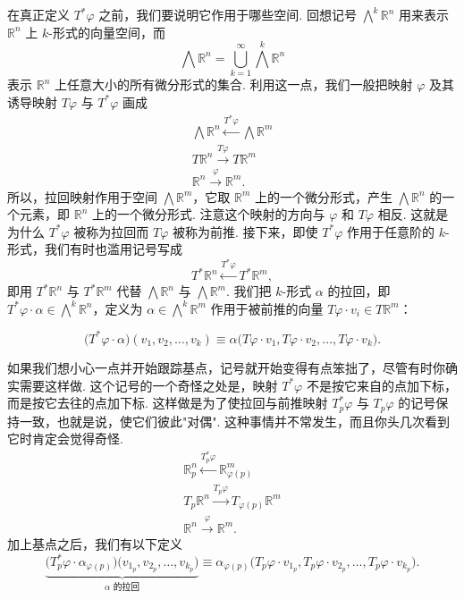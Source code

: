 在真正定义 $T^*\varphi$ 之前，我们要说明它作用于哪些空间. 回想记号 $\bigwedge^k\mathbb{R}^n$ 用来表示 $\mathbb{R}^n$ 上 $k$-形式的向量空间，而
\[
\bigwedge\mathbb{R}^n=\bigcup_{k=1}^{\infty}\bigwedge^k\mathbb{R}^n
\]
表示 $\mathbb{R}^n$ 上任意大小的所有微分形式的集合. 利用这一点，我们一般把映射 $\varphi$ 及其诱导映射 $T\varphi$ 与 $T^*\varphi$ 画成
\[
\begin{gathered}
\bigwedge\mathbb{R}^n\xleftarrow{T^*\varphi}\bigwedge\mathbb{R}^m\\
T\mathbb{R}^n\xrightarrow{T\varphi}T\mathbb{R}^m\\
\mathbb{R}^n\xrightarrow{\varphi}\mathbb{R}^m.
\end{gathered}
\]
所以，拉回映射作用于空间 $\bigwedge\mathbb{R}^m$，它取 $\mathbb{R}^m$ 上的一个微分形式，产生 $\bigwedge\mathbb{R}^n$ 的一个元素，即 $\mathbb{R}^n$ 上的一个微分形式. 注意这个映射的方向与 $\varphi$ 和 $T\varphi$ 相反. 这就是为什么 $T^*\varphi$ 被称为拉回而 $T\varphi$ 被称为前推. 接下来，即使 $T^*\varphi$ 作用于任意阶的 $k$-形式，我们有时也滥用记号写成
\[
T^*\mathbb{R}^n\xleftarrow{T^*\varphi}T^*\mathbb{R}^m,
\]
即用 $T^*\mathbb{R}^n$ 与 $T^*\mathbb{R}^m$ 代替 $\bigwedge\mathbb{R}^n$ 与 $\bigwedge\mathbb{R}^m$. 我们把 $k$-形式 $\alpha$ 的拉回，即 $T^*\varphi\cdot\alpha\in\bigwedge^k\mathbb{R}^n$，定义为 $\alpha\in\bigwedge^k\mathbb{R}^m$ 作用于被前推的向量 $T\varphi\cdot v_i\in T\mathbb{R}^m$：

\begin{definition}\label{def:6-6-1}
\[
\bigl(T^*\varphi\cdot\alpha\bigr)(v_1,v_2,\ldots,v_k)\equiv\alpha\bigl(T\varphi\cdot v_1,T\varphi\cdot v_2,\ldots,T\varphi\cdot v_k\bigr).
\]
\end{definition}

如果我们想小心一点并开始跟踪基点，记号就开始变得有点笨拙了，尽管有时你确实需要这样做. 这个记号的一个奇怪之处是，映射 $T^*\varphi$ 不是按它来自的点加下标，而是按它去往的点加下标. 这样做是为了使拉回与前推映射 $T_p^*\varphi$ 与 $T_p\varphi$ 的记号保持一致，也就是说，使它们彼此"对偶". 这种事情并不常发生，而且你头几次看到它时肯定会觉得奇怪.
\[
\begin{gathered}
\mathbb{R}^n_p\xleftarrow{T_p^*\varphi}\mathbb{R}^m_{\varphi(p)}\\
T_p\mathbb{R}^n\xrightarrow{T_p\varphi}T_{\varphi(p)}\mathbb{R}^m\\
\mathbb{R}^n\xrightarrow{\varphi}\mathbb{R}^m.
\end{gathered}
\]
加上基点之后，我们有以下定义
\[
\underbrace{\bigl(T_p^*\varphi\cdot\alpha_{\varphi(p)}\bigr)\bigl(v_{1_p},v_{2_p},\ldots,v_{k_p}\bigr)}_{\text{$\alpha$ 的拉回}}\equiv\alpha_{\varphi(p)}\bigl(T_p\varphi\cdot v_{1_p},T_p\varphi\cdot v_{2_p},\ldots,T_p\varphi\cdot v_{k_p}\bigr).
\]

